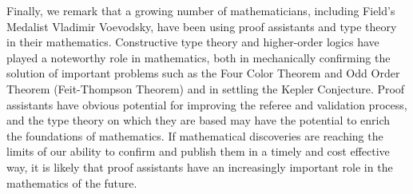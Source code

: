 Finally, we remark that a growing number of mathematicians, including Field's
Medalist Vladimir Voevodsky, have been using proof assistants and type theory
in their mathematics.
Constructive type theory and higher-order logics have played a noteworthy
role in mathematics, both in mechanically confirming the solution of important
problems such as the Four Color Theorem and Odd Order Theorem (Feit-Thompson
Theorem) and in settling the Kepler Conjecture.
Proof assistants have obvious potential for improving the
referee and validation process, and the type theory on which they are based may
have the potential to enrich the foundations of mathematics.
If mathematical discoveries are reaching the limits of our
ability to confirm and publish them in a timely and cost effective way, 
it is likely that proof assistants have an increasingly
important role in the mathematics of the future.











